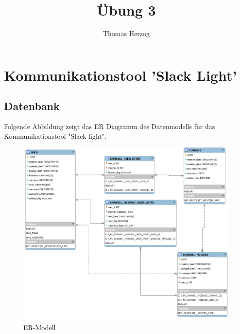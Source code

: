 \documentclass[11pt, a4paper, twoside]{article}   	%
\title{Übung 3}
\author{Thomas Herzog}
\begin{document}
\setlength{\headheight}{15mm}

{\color{myred}
	\section
		{Kommunikationstool 'Slack Light'}
}

\subsection{Datenbank}
Folgende Abbildung zeigt das ER Diagramm des Datenmodells für das Kommunikationstool "Slack light". \
\begin{figure}[h]
	\centering
	\includegraphics[scale=0.5]{images/er-model.PNG}
	\caption
	{ER-Modell}
\end{figure}

\newpage
\end{document}
